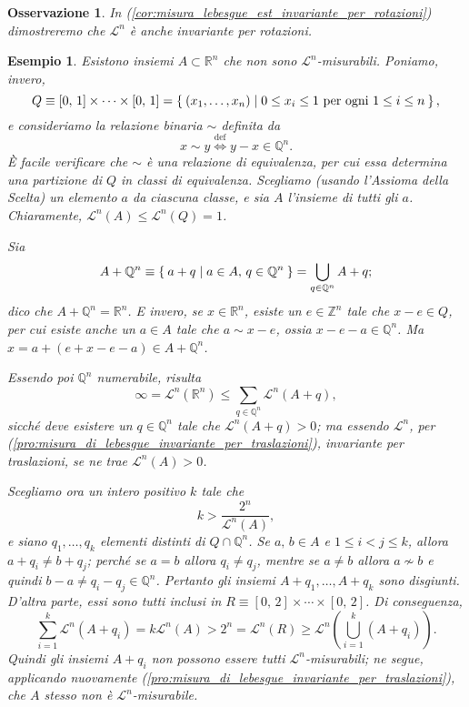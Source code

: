 \documentclass[a4paper,10pt,openright,oneside]{book}
\theoremstyle{theoremstyle}
\theoremstyle{theoremstylewoheader}
\theoremstyle{theoremstyle}
\newtheorem{esempio}[teorema]{Esempio}
\newtheorem{osservazione}[teorema]{Osservazione}
\theoremstyle{proofsecstyle}
\theoremstyle{nonumberplain}
\newcommand{\ZZ}{\ensuremath{\mathbb{Z}}}
\newcommand{\QQ}{\ensuremath{\mathbb{Q}}}
\newcommand{\RR}{\ensuremath{\mathbb{R}}}
\newcommand{\Leb}{\ensuremath{\mathcal{L}}}
\newcommand{\nsim}{\not\sim}
\begin{document}
\begin{osservazione}
In (\ref{cor:misura_lebesgue_est_invariante_per_rotazioni}) dimostreremo che $\Leb^n$ è anche invariante per rotazioni.
\end{osservazione}

\begin{esempio}
Esistono insiemi $A \subset \RR^n$ che \emph{non} sono $\Leb^n$-misurabili. Poniamo, invero,
\[
Q \equiv [0,\, 1] \times \cdots \times [0,\, 1] = \Set{ (x_1, \ldots, x_n) | 0 \le x_i \le 1 \text{ per ogni $1 \le i \le n$} },
\]
e consideriamo la relazione binaria $\sim$ definita da
\[
x \sim y \stackrel{\text{def}}{\iff} y - x \in \QQ^n. 
\]
È facile verificare che $\sim$ è una relazione di equivalenza, per cui essa determina una partizione di $Q$ in classi di equivalenza. Scegliamo (usando l'Assioma della Scelta) un elemento $a$ da ciascuna classe, e sia $A$ l'insieme di tutti gli $a$.  Chiaramente, $\Leb^n(A) \le \Leb^n(Q) = 1$.

Sia
\[
A + \QQ^n \equiv \Set{ a + q | a \in A,\, q \in \QQ^n } = \bigcup_{q \in \QQ^n} A + q;
\]
dico che $A + \QQ^n = \RR^n$. E invero, se $x \in \RR^n$, esiste un $e \in \ZZ^n$ tale che $x - e \in Q$, per cui esiste anche un $a \in A$ tale che $a \sim x - e$, ossia $x - e - a \in \QQ^n$. Ma $x = a + (e + x - e - a) \in A + \QQ^n$.

Essendo poi $\QQ^n$ numerabile, risulta
\[
\infty = \Leb^n(\RR^n) \le \sum_{q \in \QQ^n} \Leb^n(A + q),
\]
sicché deve esistere un $q \in \QQ^n$ tale che $\Leb^n(A + q) > 0$; ma essendo $\Leb^n$, per (\ref{pro:misura_di_lebesgue_invariante_per_traslazioni}), invariante per traslazioni, se ne trae $\Leb^n(A) > 0$.

Scegliamo ora un intero positivo $k$ tale che
\[
k > \frac{2^n}{\Leb^n(A)},
\]
e siano $q_1, \ldots, q_k$ elementi \emph{distinti} di $Q \cap \QQ^n$. Se $a,\, b \in A$ e $1 \le i < j \le k$, allora $a + q_i \ne b + q_j$; perché se $a = b$ allora $q_i \ne q_j$, mentre se $a \ne b$ allora $a \nsim b$ e quindi $b - a \ne q_i - q_j \in \QQ^n$. Pertanto gli insiemi $A + q_1, \ldots, A + q_k$ sono disgiunti. D'altra parte, essi sono tutti inclusi in $R \equiv [0,\, 2] \times \cdots \times [0,\, 2]$. Di conseguenza,
\[
\sum_{i=1}^k \Leb^n(A + q_i) = k\Leb^n(A) > 2^n = \Leb^n(R) \ge \Leb^n\left(\bigcup_{i=1}^k (A + q_i)\right). 
\]
Quindi gli insiemi $A + q_i$ non possono essere tutti $\Leb^n$-misurabili; ne segue, applicando nuovamente (\ref{pro:misura_di_lebesgue_invariante_per_traslazioni}), che $A$ stesso non è $\Leb^n$-misurabile.
\end{esempio}
\end{document}
